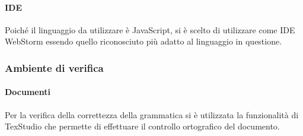                             \paragraph{IDE}
                                Poiché il linguaggio da utilizzare è JavaScript, si è scelto di utilizzare come IDE WebStorm essendo quello riconosciuto più adatto al linguaggio in questione.
                        \subsubsection{Ambiente di verifica}
                            \paragraph{Documenti} 
                                Per la verifica della correttezza della grammatica si è utilizzata la funzionalità di TexStudio che permette di effettuare il controllo ortografico del documento.
                           


                                 
                             
           
                         
                
                    
                     
                
            
    
     
            
            